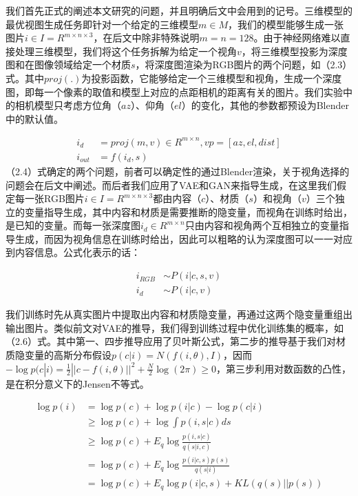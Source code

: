 \documentclass[UTF8,openany,AutoFakeBold,AutoFakeSlant,cs4size]{ctexbook}
\begin{document}
我们首先正式的阐述本文研究的问题，并且明确后文中会用到的记号。三维模型的最优视图生成任务即针对一个给定的三维模型$m \in M$，我们的模型能够生成一张图片$i \in I = R^{m \times n \times 3}$，在后文中除非特殊说明$m = n = 128$。由于神经网络难以直接处理三维模型，我们将这个任务拆解为给定一个视角$v$，将三维模型投影为深度图和在图像领域给定一个材质$s$，将深度图渲染为RGB图片的两个问题，如（2.3）式。其中$proj(.)$为投影函数，它能够给定一个三维模型和视角，生成一个深度图，即每一个像素的取值和模型上对应的点距相机的距离有关的图片。我们实验中的相机模型只考虑方位角（$az$）、仰角（$el$）的变化，其他的参数都预设为Blender中的默认值。

\begin{equation}
	\begin{aligned}
		i_{d} &= proj(m, v) \in R^{m \times n}, vp = [az, el, dist] \\
		i_{out} &= f(i_{d}, s)
	\end{aligned}
\end{equation}
（2.4）式确定的两个问题，前者可以确定性的通过Blender渲染，关于视角选择的问题会在后文中阐述。而后者我们应用了VAE和GAN来指导生成，在这里我们假定每一张RGB图片$i \in I = R^{m \times n \times 3}$都由内容（$c$）、材质（$s$）和视角（$v$）三个独立的变量指导生成，其中内容和材质是需要推断的隐变量，而视角在训练时给出，是已知的变量。而每一张深度图$i_{d} \in R^{m \times n}$只由内容和视角两个互相独立的变量指导生成，而因为视角信息在训练时给出，因此可以粗略的认为深度图可以一一对应到内容信息。公式化表示的话：

\begin{equation}
	\begin{aligned}
		i_{RGB} &\sim P(i | c, s, v) \\ i_{d} &\sim P(i | c, v)
	\end{aligned}
\end{equation}

我们训练时先从真实图片中提取出内容和材质隐变量，再通过这两个隐变量重组出输出图片。类似前文对VAE的推导，我们得到训练过程中优化训练集的概率，如（2.6）式。其中第一、四步推导应用了贝叶斯公式，第二步的推导基于我们对材质隐变量的高斯分布假设$p(c | i) = N(f(i, \theta), I)$，因而$-\log p(c | i) = \frac{1}{2}||c - f(i, \theta) ||^2 + \frac{N}{2}\log (2\pi) \geq 0$，第三步利用对数函数的凸性，是在积分意义下的Jensen不等式。

\begin{equation}
	\begin{aligned}
		\log p(i) &= \log p(c) + \log p(i | c) - \log p(c | i) \\
		&\geq \log p(c) + \log  \int p(i, s | c) ds \\
		&\geq \log p(c) + E_{q} \log \frac{p(i, s | c)}{q(s | i, c)} \\
		&= \log p(c) + E_{q} \log \frac{p(i | c, s)p(s)}{q(s | i)} \\
		&= \log p(c) + E_{q} \log p(i | c, s) + KL(q(s) || p(s)) \\
	\end{aligned}
\end{equation}
\end{document}
